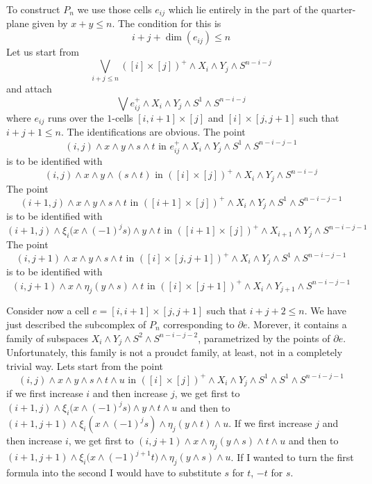 \documentclass[../main]{subfiles}
\begin{document}
To construct $P_n$ we use those cells $e_{ij}$ which lie entirely in the part of the quarter-plane given by $x+y\leq n$. The condition for this is
\[i+j+\dim(e_{ij})\leq n\]
Let us start from
\[\bigvee_{i+j\leq n}([i]\times [j])^+ \wedge X_i \wedge Y_j \wedge S^{n-i-j}\]
and attach
\[\bigvee e_{ij}^+ \wedge X_i\wedge Y_j\wedge S^1 \wedge S^{n-i-j}\]
where $e_{ij}$ runs over the $1$-cells $[i,i+1]\times [j]$ and $[i]\times [j,j+1]$ such that $i+j+1\leq n$. The identifications are obvious. The point
\[(i,j)\wedge x\wedge y\wedge s\wedge t \text{  in  }e_{ij}^+\wedge X_i \wedge Y_j \wedge S^1 \wedge S^{n-i-j-1} \]
is to be identified with
\[(i,j)\wedge x\wedge y\wedge (s\wedge t) \text{  in  }([i]\times [j])^+\wedge X_i \wedge Y_j \wedge S^{n-i-j} \]
The point
\[(i+1,j)\wedge x\wedge y\wedge s\wedge t \text{  in  }([i+1]\times [j])^+\wedge X_{i} \wedge Y_j\wedge S^1 \wedge S^{n-i-j-1} \]
is to be identified with
\[(i+1,j)\wedge \xi_i\big( x\wedge (-1)^j s\big)\wedge y\wedge t \text{  in  }([i+1]\times [j])^+\wedge X_{i+1} \wedge Y_j \wedge S^{n-i-j-1} \]
The point
\[(i,j+1)\wedge x\wedge y\wedge s\wedge t \text{  in  }([i]\times [j,j+1])^+\wedge X_{i} \wedge Y_j\wedge S^1 \wedge S^{n-i-j-1} \]
is to be identified with
\[(i,j+1)\wedge x\wedge \eta_j(y\wedge s)\wedge t \text{  in  }([i]\times [j+1])^+\wedge X_{i} \wedge Y_{j+1} \wedge S^{n-i-j-1} \]

Consider now a cell $e=[i,i+1]\times [j,j+1]$ such that $i+j+2\leq n$. We have just described the subcomplex of $P_n$ corresponding to $\partial e$. Morever, it contains a family of subspaces $X_i\wedge Y_j \wedge S^2 \wedge S^{n-i-j-2}$, parametrized by the points of $\partial e$. Unfortunately, this family is not a proudct family, at least, not in a completely trivial way. Lets start from the point
\[(i,j)\wedge x\wedge y\wedge s\wedge t\wedge u \text{  in  }([i]\times[j])^+\wedge X_i \wedge Y_j \wedge S^1 \wedge S^1\wedge S^{n-i-j-1} \]
if we first increase $i$ and then increase $j$, we get first to \newline $(i+1,j)\wedge \xi_i\big(x\wedge (-1)^j s\big) \wedge y\wedge t\wedge u $ and then to $(i+1,j+1)\wedge \xi_i(x\wedge (-1)^j s) \wedge \eta_j(y\wedge t)\wedge u $. If we first increase $j$ and then increase $i$, we get first to $(i,j+1)\wedge x\wedge   \eta_j(y\wedge s)\wedge t\wedge u $ and then to $(i+1,j+1)\wedge \xi_i\big(x\wedge (-1)^{j+1} t\big) \wedge \eta_j(y\wedge s)\wedge u $. If I wanted to turn the first formula into the second I would have to substitute $s$ for $t$, $-t$ for $s$.
\end{document}
